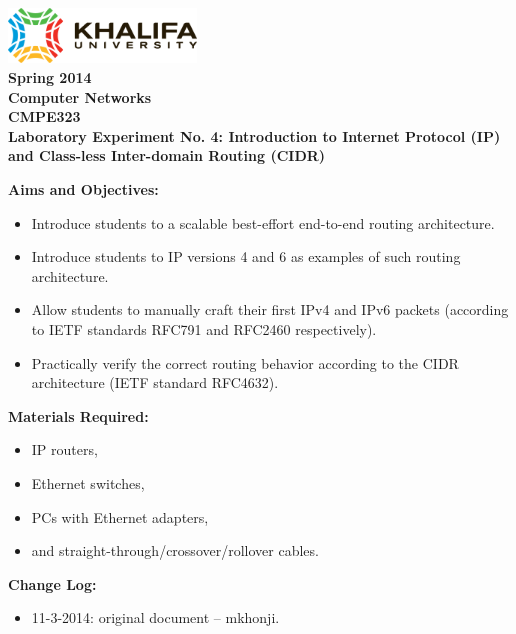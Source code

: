 \documentclass[pdftex,12pt,a4paper]{article}
\begin{document}
    \begin{titlepage}
        \begin{center}
            \includegraphics[width=5cm]{figures/kulogo}\\[1cm]
            {\Large \bfseries
                Spring 2014\\
                Computer Networks\\
                CMPE323\\[1cm]
            }
            {\large \bfseries
                \noindent Laboratory Experiment No. 4: Introduction to Internet
                Protocol (IP) and Class-less Inter-domain Routing (CIDR)\\[1cm]
            }
        \end{center}

        \noindent \textbf{Aims and Objectives:}
            \begin{itemize}[leftmargin=4cm]
                \item Introduce students to a scalable best-effort end-to-end
                    routing architecture.
                \item Introduce students to IP versions 4 and 6 as examples of
                    such routing architecture.
                \item Allow students to manually craft their first IPv4 and
                    IPv6 packets (according to IETF standards RFC791 and RFC2460
                    respectively).
                \item Practically verify the correct routing
                    behavior according to the CIDR architecture (IETF standard
                    RFC4632).
            \end{itemize}
            \vspace{0.5cm}

        \noindent \textbf{Materials Required:}
            \begin{itemize}[leftmargin=4cm]
                \item IP routers,
                \item Ethernet switches,
                \item PCs with Ethernet adapters,
                \item and straight-through/crossover/rollover cables.
            \end{itemize}
            \vspace{0.5cm}

        \noindent \textbf{Change Log:}
            \begin{itemize}[leftmargin=4cm]
                \item 11-3-2014: original document -- mkhonji.
            \end{itemize}
    \end{titlepage}
    \newpage
\end{document}
